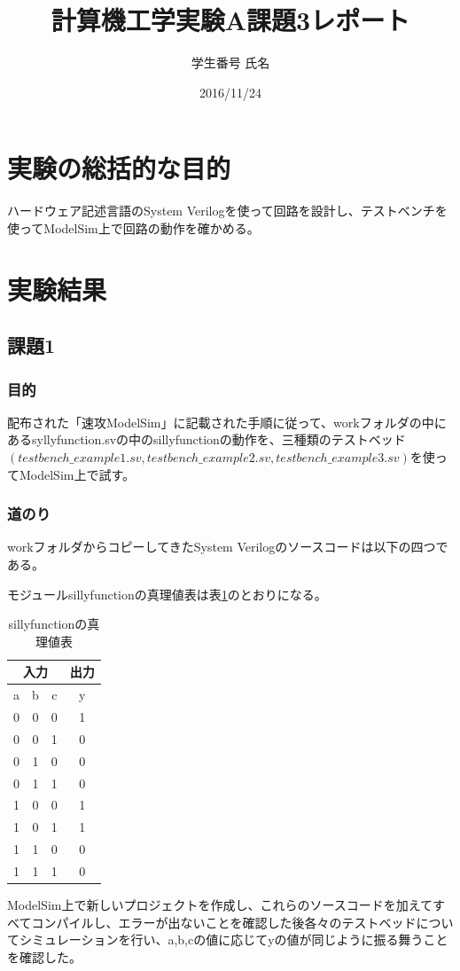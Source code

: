 \documentclass[a4paper]{jarticle}
\title{計算機工学実験A課題3レポート}
\author{学生番号 氏名}
\date{2016/11/24}
\begin{document}
\maketitle
\section{実験の総括的な目的}
ハードウェア記述言語のSystem Verilogを使って回路を設計し、テストベンチを使ってModelSim上で回路の動作を確かめる。
\section{実験結果}
\subsection{課題1}
\subsubsection{目的}
配布された「速攻ModelSim」に記載された手順に従って、workフォルダの中にあるsyllyfunction.svの中のsillyfunctionの動作を、三種類のテストベッド$(testbench\_example1.sv,testbench\_example2.sv,testbench\_example3.sv)$を使ってModelSim上で試す。
\subsubsection{道のり}
workフォルダからコピーしてきたSystem Verilogのソースコードは以下の四つである。




モジュールsillyfunctionの真理値表は表\ref{Work1TruthTable}のとおりになる。
\begin{table}[ht]
	\begin{center}
		\caption{sillyfunctionの真理値表}
		\label{Work1TruthTable}
		\begin{tabular}{|c|c|c||c|}
			\hline
			\multicolumn{3}{|c|}{入力} & \multicolumn{1}{|c|}{出力}\\ \hline\hline
			a	&b	&c	&y\\	\hline\hline
			0	&0	&0	&1\\	\hline
			0	&0	&1	&0\\	\hline
			0	&1	&0	&0\\	\hline
			0	&1	&1	&0\\	\hline
			1	&0	&0	&1\\	\hline
			1	&0	&1	&1\\	\hline
			1	&1	&0	&0\\	\hline
			1	&1	&1	&0\\	\hline
		\end{tabular}
	\end{center}
\end{table}
ModelSim上で新しいプロジェクトを作成し、これらのソースコードを加えてすべてコンパイルし、エラーが出ないことを確認した後各々のテストベッドについてシミュレーションを行い、a,b,cの値に応じてyの値が同じように振る舞うことを確認した。
\end{document}

